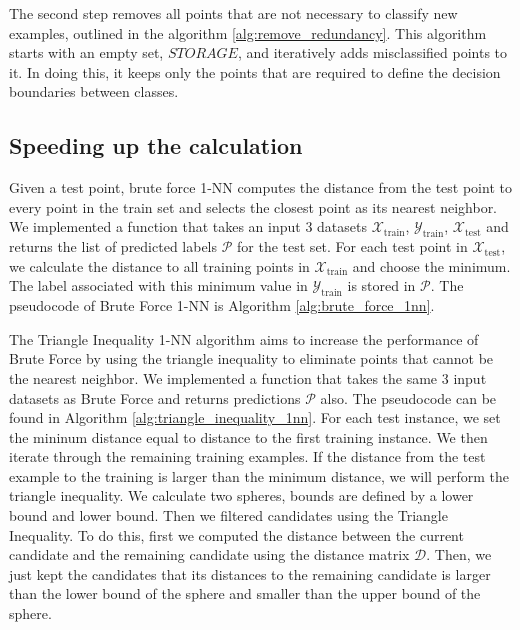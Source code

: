 \documentclass{article}
\theoremstyle{plain}
\theoremstyle{definition}
\theoremstyle{remark}
\begin{document}
    The second step removes all points that are not necessary to classify new examples, outlined in the algorithm \ref{alg:remove_redundancy}. This algorithm starts with an empty set, $STORAGE$, and iteratively adds misclassified points to it. In doing this, it keeps only the points that are required to define the decision boundaries between classes.



\subsection{Speeding up the calculation}

Given a test point, brute force 1-NN computes the distance from the test point to every point in the train set and selects the closest point as its nearest neighbor. We implemented a function that takes an input 3 datasets $\mathcal{X}_{\text{train}}$, $\mathcal{Y}_{\text{train}}$, $\mathcal{X}_{\text{test}}$ and returns the list of predicted labels $\mathcal{P}$ for the test set. For each test point in $\mathcal{X}_{\text{test}}$, we calculate the distance to all training points in $\mathcal{X}_{\text{train}}$ and choose the minimum. The label associated with this minimum value in $\mathcal{Y}_{\text{train}}$ is stored in $\mathcal{P}$. The pseudocode of Brute Force 1-NN is Algorithm \ref{alg:brute_force_1nn}.

The Triangle Inequality 1-NN algorithm aims to increase the performance of Brute Force by using the triangle inequality to eliminate points that cannot be the nearest neighbor. We implemented a function that takes the same 3 input datasets as Brute Force and returns predictions $\mathcal{P}$ also. The pseudocode can be found in Algorithm \ref{alg:triangle_inequality_1nn}. For each test instance, we set the mininum distance equal to distance to the first training instance. We then iterate through the remaining training examples. If the distance from the test example to the training is larger than the minimum distance, we will perform the triangle inequality. We calculate two spheres, bounds are defined by a lower bound and lower bound. Then we filtered candidates using the Triangle Inequality. To do this, first we computed the distance between the current candidate and the remaining candidate using the distance matrix $\mathcal{D}$. Then, we just kept the candidates that its distances to the remaining candidate is larger than the lower bound of the sphere and smaller than the upper bound of the sphere.
\end{document}
